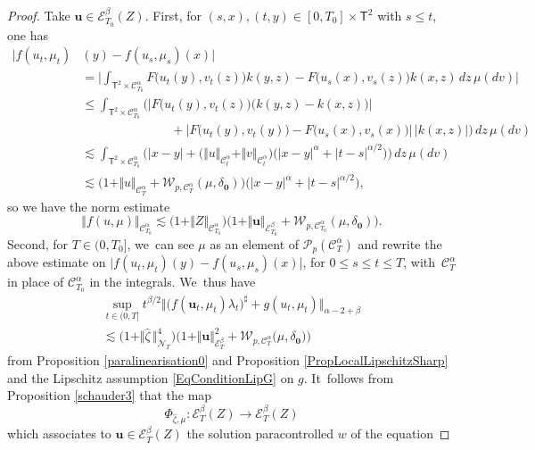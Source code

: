 \documentclass[JEP,XML,SOM,Unicode,published]{cedram}
\theoremstyle{definition}
\newcommand{\bfzero}{\mathbf{0}}
\newcommand{\mcE}{\mathcal{E}}
\newcommand{\mcN}{\mathcal{N}}
\newcommand{\mcP}{\mathcal{P}}
\newcommand\mcW{\mathcal W}
\newcommand{\bsu}{\boldsymbol{u}}
\newcommand{\scrC}{\ensuremath{\mathscr{C}}}
\newcommand{\norme}[1]{\Vert #1 \Vert}
\begin{document}
\begin{proof}
Take $\bsu\in\mcE^\beta_{T_0}(Z)$. First, for $(s,x),(t,y)\in [0,T_0]\times \mathsf{T}^2$ with $s\leq t$, one has
\begin{align*}
\big|f(u_t,\mu_t)&(y) - f(u_s,\mu_s)(x)\big| \\
&= \big|\int_{\mathsf{T}^2\times\scrC_{T_0}^\alpha} F\bigl(u_t(y),v_t(z)\bigr)k(y,z) - F\bigl(u_s(x),v_s(z)\bigr) k(x,z) \, dz\,\mu(dv)\big| \\
&\leq \int_{\mathsf{T}^2\times\scrC_{T_0}^\alpha} \biggl( \big|F\bigl(u_t(y),v_t(z)\bigr) \bigl(k(y,z)-k(x,z)\bigr)\big|
\\
&\hspace{3cm}+ \big|F\bigl(u_t(y),v_t(y)\bigr)-F\bigl(u_s(x),v_s(x)\bigr)\big| \, |k(x,z)| \biggr) \, dz\,\mu(dv)
\\
&\lesssim \int_{\mathsf{T}^2\times\scrC_{T_0}^\alpha} \bigl( |x-y| +\bigl(\norme{u}_{\scrC^\alpha_t} + \norme{v}_{\scrC^\alpha_t} \bigr) \bigl(|x-y|^\alpha+|t-s|^{\alpha/2}\bigr)\bigr) \, dz\,\mu(dv)
\\
&\lesssim \bigl(1+\norme{u}_{\scrC^\alpha_T}+\mcW_{p,\scrC^\alpha_T}(\mu,\delta_\bfzero) \bigr)\bigl(|x-y|^\alpha+|t-s|^{\alpha/2}\bigr),
\end{align*}
so we have the norm estimate
\[
\norme{f(u,\mu)}_{\scrC^\alpha_{T_0}}\lesssim \bigl(1 + \norme{Z}_{\scrC_{T_0}^\alpha}\bigr) \bigl(1+ \Vert \bsu\Vert_{\mcE^\beta_{T_0}} + \mcW_{p,\scrC^\alpha_{T_0}}(\mu,\delta_\bfzero)\bigr).
\]
Second, for $T\in(0,T_0]$, we~can see $\mu$ as an element of $\mcP_p(\scrC^\alpha_T)$ and rewrite the above estimate on $\big|f(u_t,\mu_t)(y) - f(u_s, \mu_s)(x)\big|$, for $0\leq s\leq t\leq T$, with~$\scrC^\alpha_T$ in place of $\scrC^\alpha_{T_0}$ in the integrals. We~thus have
\begin{multline}\label{estimeerhs1}
\sup_{t\in(0,T]} t^{\beta/2}\big\Vert \bigl(f(\bsu_t,\mu_t)\lambda_t\bigr)^\sharp + g(u_t,\mu_t)\big\Vert_{\alpha-2+\beta}\\ \lesssim \bigl( 1 + \Vert\widehat\zeta\hspace{2pt}\Vert_{{\boldsymbol{\mcN}}_T}^4 \bigr) \bigl(1 + \Vert \bsu\Vert^2_{\mcE^\beta_T} + \mcW_{p,\scrC^\alpha_T}\bigl(\mu,\delta_\bfzero\bigr)\bigr)
\end{multline}
from Proposition \ref{paralinearisation0} and Proposition \ref{PropLocalLipschitzSharp} and the Lipschitz assumption \eqref{EqConditionLipG} on $g$. It~follows from Proposition \ref{schauder3} that the map
\[
\Phi_{\widehat\zeta,\mu} : \mcE^\beta_T(Z) \to\mcE^\beta_T(Z)
\]
which associates to $\bsu\in \mcE^\beta_T(Z)$ the solution paracontrolled $w$ of the equation

\end{proof}
\end{document}
